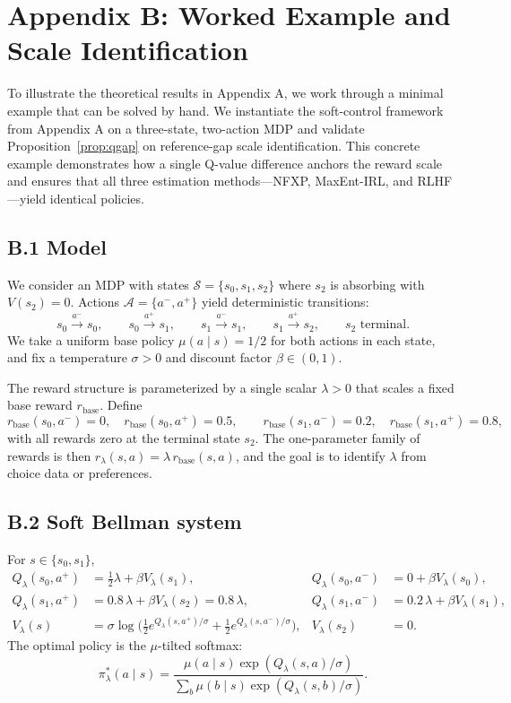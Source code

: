 \appendix
\section*{Appendix B: Worked Example and Scale Identification}

To illustrate the theoretical results in Appendix A, we work through a minimal example that can be solved by hand. We instantiate the soft-control framework from Appendix A on a three-state, two-action MDP and validate Proposition~\ref{prop:qgap} on reference-gap scale identification. This concrete example demonstrates how a single Q-value difference anchors the reward scale and ensures that all three estimation methods---NFXP, MaxEnt-IRL, and RLHF---yield identical policies.

\subsection*{B.1 Model}

We consider an MDP with states $\mathcal S=\{s_0,s_1,s_2\}$ where $s_2$ is absorbing with $V(s_2)=0$. Actions $\mathcal A=\{a^-,a^+\}$ yield deterministic transitions:
\[
s_0\!\xrightarrow{a^-}\! s_0,\qquad s_0\!\xrightarrow{a^+}\! s_1,\qquad
s_1\!\xrightarrow{a^-}\! s_1,\qquad s_1\!\xrightarrow{a^+}\! s_2,\qquad
s_2\text{ terminal.}
\]
We take a uniform base policy $\mu(a\mid s)=1/2$ for both actions in each state, and fix a temperature $\sigma>0$ and discount factor $\beta\in(0,1)$.

The reward structure is parameterized by a single scalar $\lambda>0$ that scales a fixed base reward $r_{\text{base}}$. Define
\[
r_{\text{base}}(s_0,a^-) = 0,\quad r_{\text{base}}(s_0,a^+) = 0.5,\qquad
r_{\text{base}}(s_1,a^-) = 0.2,\quad r_{\text{base}}(s_1,a^+) = 0.8,
\]
with all rewards zero at the terminal state $s_2$.
The one-parameter family of rewards is then $r_\lambda(s,a)=\lambda\,r_{\text{base}}(s,a)$, and the goal is to identify $\lambda$ from choice data or preferences.

\subsection*{B.2 Soft Bellman system}

For $s\in\{s_0,s_1\}$,
\[
\begin{aligned}
Q_\lambda(s_0,a^+) &= \tfrac{1}{2}\lambda + \beta V_\lambda(s_1),&
Q_\lambda(s_0,a^-) &= 0 + \beta V_\lambda(s_0),\\
Q_\lambda(s_1,a^+) &= 0.8\,\lambda + \beta V_\lambda(s_2)=0.8\,\lambda,&
Q_\lambda(s_1,a^-) &= 0.2\,\lambda + \beta V_\lambda(s_1),\\
V_\lambda(s) &= \sigma\log\!\Big(\tfrac12 e^{Q_\lambda(s,a^+)/\sigma}+\tfrac12 e^{Q_\lambda(s,a^-)/\sigma}\Big),&
V_\lambda(s_2)&=0.
\end{aligned}
\]
The optimal policy is the $\mu$-tilted softmax:
\[
\pi^{\ast}_\lambda(a\mid s)=\frac{\mu(a\mid s)\exp(Q_\lambda(s,a)/\sigma)}{\sum_b \mu(b\mid s)\exp(Q_\lambda(s,b)/\sigma)}.
\]


